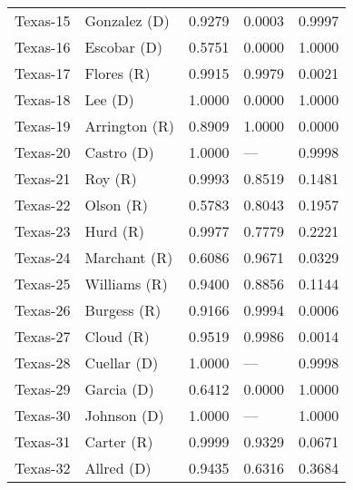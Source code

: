 \begin{longtable}{llrll}
          Texas-15 &         {\color{Blue} Gonzalez (D)} &       0.9279 &        0.0003 &        0.9997 \\
          Texas-16 &          {\color{Blue} Escobar (D)} &       0.5751 &        0.0000 &        1.0000 \\
          Texas-17 &            {\color{Red} Flores (R)} &       0.9915 &        0.9979 &        0.0021 \\
          Texas-18 &              {\color{Blue} Lee (D)} &       1.0000 &        0.0000 &        1.0000 \\
          Texas-19 &         {\color{Red} Arrington (R)} &       0.8909 &        1.0000 &        0.0000 \\
          Texas-20 &           {\color{Blue} Castro (D)} &       1.0000 &           --- &        0.9998 \\
          Texas-21 &               {\color{Red} Roy (R)} &       0.9993 &        0.8519 &        0.1481 \\
          Texas-22 &             {\color{Red} Olson (R)} &       0.5783 &        0.8043 &        0.1957 \\
          Texas-23 &              {\color{Red} Hurd (R)} &       0.9977 &        0.7779 &        0.2221 \\
          Texas-24 &          {\color{Red} Marchant (R)} &       0.6086 &        0.9671 &        0.0329 \\
          Texas-25 &          {\color{Red} Williams (R)} &       0.9400 &        0.8856 &        0.1144 \\
          Texas-26 &           {\color{Red} Burgess (R)} &       0.9166 &        0.9994 &        0.0006 \\
          Texas-27 &             {\color{Red} Cloud (R)} &       0.9519 &        0.9986 &        0.0014 \\
          Texas-28 &          {\color{Blue} Cuellar (D)} &       1.0000 &           --- &        0.9998 \\
          Texas-29 &           {\color{Blue} Garcia (D)} &       0.6412 &        0.0000 &        1.0000 \\
          Texas-30 &          {\color{Blue} Johnson (D)} &       1.0000 &           --- &        1.0000 \\
          Texas-31 &            {\color{Red} Carter (R)} &       0.9999 &        0.9329 &        0.0671 \\
          Texas-32 &           {\color{Blue} Allred (D)} &       0.9435 &        0.6316 &        0.3684 \\

\end{longtable}
